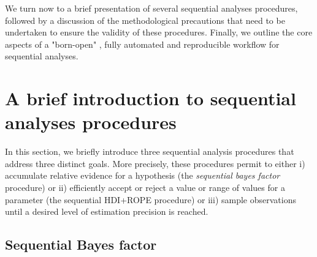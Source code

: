 \documentclass[a4paper,jou,natbib,floatsintext,donotrepeattitle]{apa6}
\begin{document}
We turn now to a brief presentation of several sequential analyses procedures, followed by a discussion of the methodological precautions that need to be undertaken to ensure the validity of these procedures. Finally, we outline the core aspects of a "born-open" \citep[following the terminology of][]{rouder_what_2016}, fully automated and reproducible workflow for sequential analyses.

\section{A brief introduction to sequential analyses procedures}


In this section, we briefly introduce three sequential analysis procedures that address three distinct goals. More precisely, these procedures permit to either i) accumulate relative evidence for a hypothesis (the \textit{sequential bayes factor} procedure) or ii) efficiently accept or reject a value or range of values for a parameter (the sequential HDI+ROPE procedure) or iii) sample observations until a desired level of estimation precision is reached.

\subsection{Sequential Bayes factor}
\end{document}
